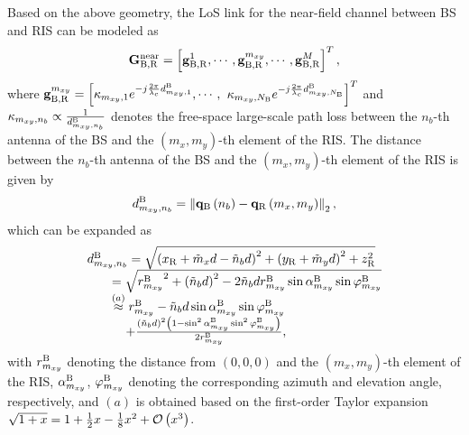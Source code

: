 \documentclass[lettersize, journal]{IEEEtran}
\begin{document}
Based on the above geometry,  the LoS link for the near-field channel between BS and RIS can be modeled as {\cite{cui2021near}}
\begin{equation}
{{\bf{G}}_{{\rm{B}}, {\rm{R}}}^{\rm{near}}} = \left[ {\bf{g}}_{{\rm{B}}, {\rm{R}}}^1, \cdots, {\bf{g}}_{{\rm{B}}, {\rm{R}}}^{m_{xy}}, \cdots, {\bf{g}}_{{\rm{B}}, {\rm{R}}}^{M} \right]^T, 
\end{equation}
where ${\bf{g}}_{{\rm{B}}, {\rm{R}}}^{m_{xy}} = \Big[ \kappa_{m_{xy}, 1} e^{-j\frac{{2\pi }}{\lambda_c }d_{m_{xy},1}^{\rm{B}}}, \cdots, $ $ \kappa_{m_{xy}, N_{\rm{B}}} e^{-j\frac{{2\pi }}{\lambda_c }d_{m_{xy}, N_{\rm{B}}}^{\rm{B}}} \Big] ^T $ and $\kappa_{m_{xy}, n_b} \propto  \frac{1}{ d_{m_{xy}, n_b}^{\rm{B}}}$ denotes the free-space large-scale path loss between the $n_b$-th antenna of the BS and the $\left( m_x, m_y\right)$-th element of the RIS. 
The distance between the $n_b$-th antenna of the BS and the $\left( m_x, m_y\right)$-th element of the RIS is given by
\begin{equation}
d_{m_{xy}, n_b}^{\rm{B}} = \left \| {\bf{q}}_{\rm{B}}\left( n_b \right) -  {\bf{q}}_{\rm{R}}\left( m_x, m_y \right) \right \|_2, 
\end{equation}
which can be expanded as  
\begin{equation}
\begin{array}{l}
d_{m_{xy}, n_b}^{\rm{B}} = \sqrt{ \left( x_{\rm{R}}+{{\tilde m}_x}d - {{\tilde n}_b}d \right)^2 + \left( y_{\rm{R}}+{{\tilde m}_y}d \right)^2 + z_{\rm{R}}^2}  \\
\;\;\;\;\;\;\; = \sqrt{ {r_{m_{xy}}^{\rm{B}}}^2  + \left( {{\tilde n}_b}d \right)^2  - 2 {{\tilde n}_b}d r_{m_{xy}}^{\rm{B}} \sin  \alpha_{m_{xy}}^{\rm{B}}  \sin  \varphi_{m_{xy}}^{\rm{B}}  } \\
\;\;\;\;\;\;\; \overset{\left ( a \right ) }{\approx }  r_{m_{xy}}^{\rm{B}}  - {{\tilde n}_b}d \sin \alpha_{m_{xy}}^{\rm{B}} \sin \varphi_{m_{xy}}^{\rm{B}}  \\
\;\;\;\;\;\;\;\;\;\;\;  + \frac{\left( {{\tilde n}_b}d \right)^2 \left( 1- \sin^2 \alpha_{m_{xy}}^{\rm{B}} \sin^2 \varphi_{m_{xy}}^{\rm{B}} \right) }{2r_{m_{xy}}^{\rm{B}}},
\end{array} 
\end{equation}
with $r_{m_{xy}}^{\rm{B}}$ denoting the distance from $\left( 0, 0, 0 \right) $ and the $\left( m_x, m_y\right)$-th element of the RIS, $ \alpha_{m_{xy}}^{\rm{B}} $, $ \varphi_{m_{xy}}^{\rm{B}}$ denoting the corresponding azimuth and elevation angle, respectively,  and ${\left ( a \right ) }$ is obtained based on the first-order Taylor expansion $\sqrt{ 1 + x  } = 1 + \frac{1}{2}x - \frac{1}{8}x^2 + {\cal{O}} \left ( x^3 \right )$.
\end{document}
